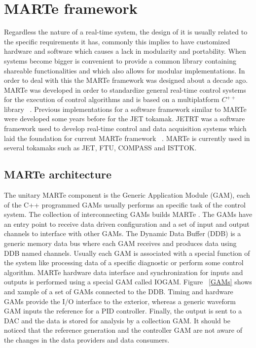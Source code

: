 \section{MARTe framework}
Regardless the nature of a real-time system, the design of it is usually related to the specific requirements it has, commonly this implies to have customized hardware and software which causes a lack in modularity and portability. When systems become bigger is convenient to provide a common library containing shareable functionalities and which also allows for modular implementations. In order to deal with this the MARTe framework was designed about a decade ago. MARTe was developed in order to standardize general real-time control systems for the execution of control algorithms and is based on a multiplatform $C^{++}$ library ~\cite{Neto2010}.  Previous implementations for a  software framework similar to MARTe were developed some years before for the JET tokamak. JETRT was a software framework used to develop real-time control and data acquisition systems which laid the foundation for current MARTe framework ~\cite{JETRT}. MARTe is currently used in several tokamaks such as JET, FTU, COMPASS and ISTTOK. 

\subsection{MARTe architecture }
The unitary MARTe component is the Generic Application Module (GAM), each of the C++ programmed GAMs usually performs an specific task of the control system. The collection of interconnecting GAMs builds MARTe  \cite{Neto2011}. The GAMs  have an entry point to receive data driven configuration and a set of input and output channels to interface with other GAMs. The Dynamic Data Buffer (DDB) is a generic memory data bus where each GAM receives and produces data using DDB named channels. Usually each GAM is associated with a special function of the system like processing data of a specific diagnostic or perform some  control algorithm. MARTe hardware data interface and synchronization for inputs and outputs is performed using a special GAM called IOGAM. Figure ~\ref{GAMs} shows and xample of a set of GAMs connected to the DDB. Timing and hardware GAMs provide the I/O interface to the exterior, whereas a generic waveform GAM inputs the reference for a PID controller. Finally, the output is sent to a DAC and the data is stored for analysis by a collection GAM.  It should be noticed that the reference generation and the controller GAM are not aware of the changes in the data providers and data consumers.



